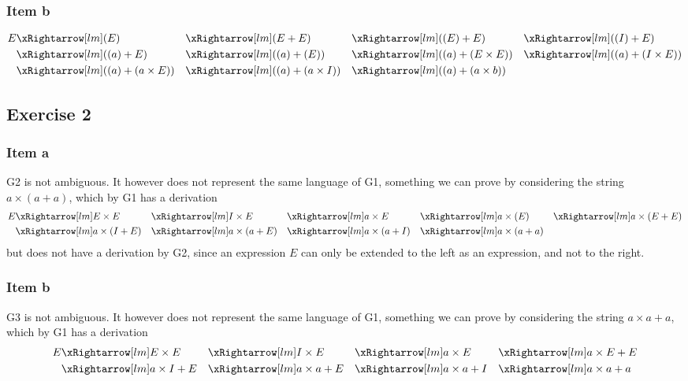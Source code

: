 {\subsubsection{Item b}
\begin{alignat*}{6}
	E
	& \lmd (E)
	&&\lmd (E+E)
	&&\lmd ((E)+E)
	&&\lmd ((I)+E) \\
	& \lmd ((a)+E)
	&&\lmd ((a)+(E)) 
	&&\lmd ((a)+(E \times E))
	&&\lmd ((a)+(I \times E)) \\ 
	& \lmd ((a)+(a \times E)) 
	&&\lmd ((a)+(a \times I)) 
	&&\lmd ((a)+(a \times b)) 
\end{alignat*}
\begin{center}
\end{center}
\subsection{Exercise 2}
\subsubsection{Item a}
G2 is not ambiguous. It however does not represent the same language of G1, something we can prove by considering the string $a \times (a+a)$, which by G1 has a derivation
\begin{alignat*}{6}
	E
	&\lmd E \times E
	&&\lmd I \times E
	&&\lmd a \times E
	&&\lmd a \times (E)
	&&\lmd a \times (E+E) \\
	&\lmd a \times (I+E)
	&&\lmd a \times (a+E)
	&&\lmd a \times (a+I)
	&&\lmd a \times (a+a)
\end{alignat*}
but does not have a derivation by G2, since an expression $E$ can only be extended to the left as an expression, and not to the right.
\subsubsection{Item b}
G3 is not ambiguous. It however does not represent the same language of G1, something we can prove by considering the string $a \times a+a$, which by G1 has a derivation
\begin{alignat*}{6}
	E
	&\lmd E \times E
	&&\lmd I \times E
	&&\lmd a \times E
	&&\lmd a \times E+E \\
	&\lmd a \times I+E
	&&\lmd a \times a+E
	&&\lmd a \times a+I
	&&\lmd a \times a+a
\end{alignat*}
}
